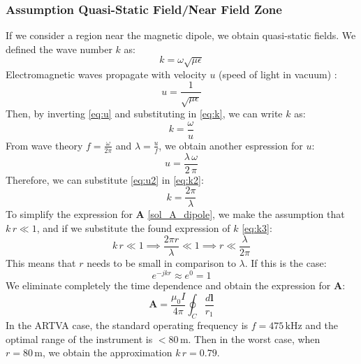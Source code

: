 \subsubsection{Assumption Quasi-Static Field/Near Field Zone}
If we consider a region near the magnetic dipole, we obtain quasi-static fields. We defined the wave number $k$ as:
\begin{equation}
k = \omega \sqrt{\mu \epsilon}
    \label{eq:k}
\end{equation}
Electromagnetic waves propagate with velocity $u$ (speed of light in vacuum) \cite{book-magnetism}:
\begin{equation}
    u = \frac{1}{\sqrt{\mu \epsilon}}
    \label{eq:u}
\end{equation}
Then, by inverting \ref{eq:u} and substituting in \ref{eq:k}, we can write $k$ as:
\begin{equation}
    k = \frac{\omega}{u}
    \label{eq:k2}
\end{equation}
From wave theory $ f = \frac{\omega}{2\pi} $ and $\lambda = \frac{u}{f}$, we obtain another espression for $u$:
\begin{equation}
   u = \frac{\lambda \, \omega}{2 \, \pi} 
\end{equation}
\label{eq:u2}
\noindent
Therefore, we can substitute \ref{eq:u2} in \ref{eq:k2}:
\begin{equation}
    k = \frac{2 \pi}{\lambda}
    \label{eq:k3}
\end{equation}
To simplify the expression for $\mathbf{A}$ \ref{sol_A_dipole}, we make the assumption that $ k \, r \ll 1 $, and if we substitute the found expression of $k$ \ref{eq:k3}:
\[
k \, r \ll 1 \implies \frac{2\pi r}{\lambda} \ll 1 \implies r \ll \frac{\lambda}{2\pi}
\]
This means that $r$ needs to be small in comparison to $\lambda$. If this is the case:
\[
e^{-j k r} \approx e^0 = 1
\]
We eliminate completely the time dependence and obtain the expression for $\mathbf{A}$:
\begin{equation}
    \mathbf{A} = \frac{\mu_0 I}{4\pi} \oint_C \frac{d\mathbf{l}}{r_1}
    \label{A_approx}
\end{equation}
In the ARTVA case, the standard operating frequency is \( f = 475 \, \text{kHz} \) and the optimal range of the instrument is \( <80 \, \text{m} \). Then in the worst case, when \( r = 80 \, \text{m} \), we obtain the approximation \( k \, r = 0.79 \).

